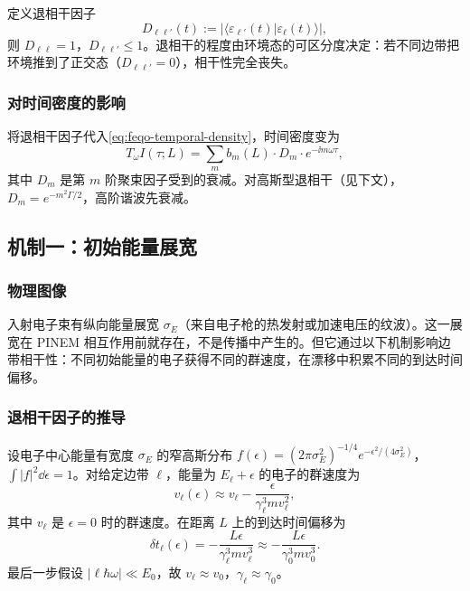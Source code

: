定义退相干因子
\begin{equation}
D_{\ell\ell'}(t):=|\langle\varepsilon_{\ell'}(t)|\varepsilon_\ell(t)\rangle|,
\label{eq:feqo-decoherence-factor-def}
\end{equation}
则 $D_{\ell\ell}=1$，$D_{\ell\ell'}\leq 1$。退相干的程度由环境态的可区分度决定：若不同边带把环境推到了正交态（$D_{\ell\ell'}=0$），相干性完全丧失。

\subsubsection{对时间密度的影响}

将退相干因子代入\cref{eq:feqo-temporal-density}，时间密度变为
\begin{equation}
T_\omega I(\tau;L)=\sum_{m}b_m(L)\cdot D_m\cdot e^{-\ii m\omega\tau},
\label{eq:feqo-damped-temporal-density}
\end{equation}
其中 $D_m$ 是第 $m$ 阶聚束因子受到的衰减。对高斯型退相干（见下文），$D_m=e^{-m^2\Gamma/2}$，高阶谐波先衰减。

\subsection{机制一：初始能量展宽}

\subsubsection{物理图像}

入射电子束有纵向能量展宽 $\sigma_E$（来自电子枪的热发射或加速电压的纹波）。这一展宽在 PINEM 相互作用前就存在，不是传播中产生的。但它通过以下机制影响边带相干性：不同初始能量的电子获得不同的群速度，在漂移中积累不同的到达时间偏移。

\subsubsection{退相干因子的推导}

设电子中心能量有宽度 $\sigma_E$ 的窄高斯分布 $f(\epsilon)=(2\pi\sigma_E^2)^{-1/4}e^{-\epsilon^2/(4\sigma_E^2)}$，$\int|f|^2\dd\epsilon=1$。对给定边带 $\ell$，能量为 $E_\ell+\epsilon$ 的电子的群速度为
\begin{equation}
v_\ell(\epsilon)\approx v_\ell-\frac{\epsilon}{\gamma_\ell^3 mv_\ell^2},
\label{eq:feqo-energy-dependent-velocity}
\end{equation}
其中 $v_\ell$ 是 $\epsilon=0$ 时的群速度。在距离 $L$ 上的到达时间偏移为
\begin{equation}
\delta t_\ell(\epsilon)=-\frac{L\epsilon}{\gamma_\ell^3 mv_\ell^3}\approx-\frac{L\epsilon}{\gamma_0^3 mv_0^3}.
\label{eq:feqo-arrival-time-jitter}
\end{equation}
最后一步假设 $|\ell\hbar\omega|\ll E_0$，故 $v_\ell\approx v_0$，$\gamma_\ell\approx\gamma_0$。

